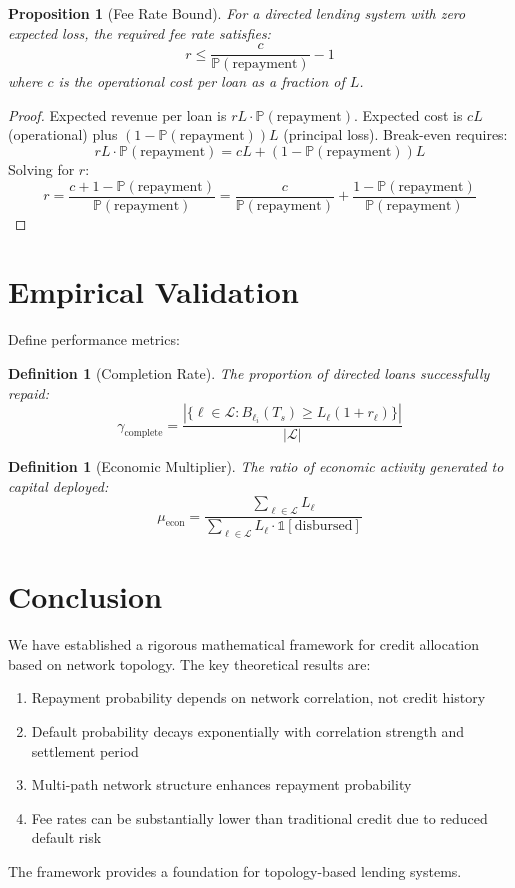 \documentclass[12pt]{article}
\newtheorem{definition}[theorem]{Definition}
\newtheorem{proposition}[theorem]{Proposition}
\begin{document}
\begin{proposition}[Fee Rate Bound]
For a directed lending system with zero expected loss, the required fee rate satisfies:
$$
r \leq \frac{c}{\mathbb{P}(\text{repayment})} - 1
$$
where $c$ is the operational cost per loan as a fraction of $L$.
\end{proposition}

\begin{proof}
Expected revenue per loan is $rL \cdot \mathbb{P}(\text{repayment})$. Expected cost is $cL$ (operational) plus $(1-\mathbb{P}(\text{repayment}))L$ (principal loss). Break-even requires:
$$
rL \cdot \mathbb{P}(\text{repayment}) = cL + (1-\mathbb{P}(\text{repayment}))L
$$
Solving for $r$:
$$
r = \frac{c + 1 - \mathbb{P}(\text{repayment})}{\mathbb{P}(\text{repayment})} = \frac{c}{\mathbb{P}(\text{repayment})} + \frac{1-\mathbb{P}(\text{repayment})}{\mathbb{P}(\text{repayment})}
$$
\end{proof}

\section{Empirical Validation}

Define performance metrics:

\begin{definition}[Completion Rate]
The proportion of directed loans successfully repaid:
$$
\gamma_{\text{complete}} = \frac{|\{\ell \in \mathcal{L} : B_{\ell_i}(T_s) \geq L_\ell(1+r_\ell)\}|}{|\mathcal{L}|}
$$
\end{definition}

\begin{definition}[Economic Multiplier]
The ratio of economic activity generated to capital deployed:
$$
\mu_{\text{econ}} = \frac{\sum_{\ell \in \mathcal{L}} L_\ell}{\sum_{\ell \in \mathcal{L}} L_\ell \cdot \mathbb{1}[\text{disbursed}]}
$$
\end{definition}

\section{Conclusion}

We have established a rigorous mathematical framework for credit allocation based on network topology. The key theoretical results are:
\begin{enumerate}
    \item Repayment probability depends on network correlation, not credit history
    \item Default probability decays exponentially with correlation strength and settlement period
    \item Multi-path network structure enhances repayment probability
    \item Fee rates can be substantially lower than traditional credit due to reduced default risk
\end{enumerate}

The framework provides a foundation for topology-based lending systems.
\end{document}
